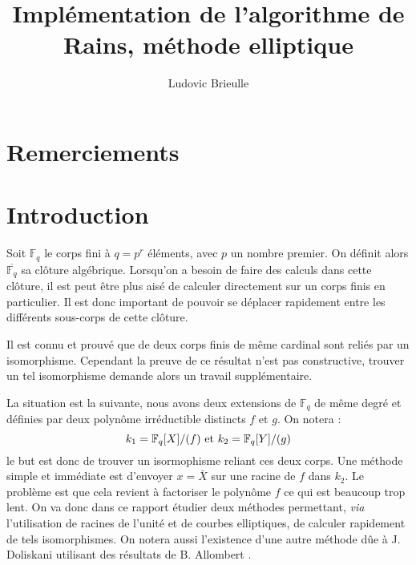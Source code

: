 \documentclass[a4paper]{article} %
\numberwithin{section}{part}
\numberwithin{equation}{section}
\newcommand\GF[1]{\mathbb{F}_{#1}}
\begin{document}
\title{Implémentation de l'algorithme de Rains, méthode elliptique}
\author{Ludovic Brieulle}
\newtheorem{thm}{Thèorème}[section]
\newtheorem{lem}[thm]{Lemme}
\newtheorem{cor}{Corollaire}[thm]
\newtheorem{prop}[thm]{Proposition}
\theoremstyle{definition}
\newtheorem{defn}[thm]{Définition}
\newtheorem*{ex}{Exemple}
\theoremstyle{remark}
\newtheorem{rem}{Remarque}[thm]

\maketitle
\part*{Remerciements}

\tableofcontents
\newpage

\part*{Introduction}
Soit $\GF{q}$ le corps fini à $q = p^r$ éléments, avec $p$ un nombre premier. On
définit alors $\overline{\GF{q}}$ sa clôture algébrique. Lorsqu'on a besoin de
faire des calculs dans cette clôture, il est peut être plus aisé de calculer
directement sur un corps finis en particulier. Il est donc important de pouvoir
se déplacer rapidement entre les différents sous-corps de cette clôture.\par
Il est connu et prouvé que de deux corps finis de même cardinal sont reliés par
un isomorphisme. Cependant la preuve de ce résultat n'est pas constructive,
trouver un tel isomorphisme demande alors un travail supplémentaire.\par
La situation est la suivante, nous avons deux extensions de $\GF{q}$ de même
degré et définies par deux polynôme irréductible distincts $f$ et $g$. On notera
:
\[k_1=\GF{q}[X]/(f)\textup{ et }k_2=\GF{q}[Y]/(g)\]
le but est donc de trouver un isormophisme reliant ces deux corps. Une méthode
simple et immédiate est d'envoyer $x = \bar{X}$ sur une racine de $f$ dans
$k_2$. Le problème est que cela revient à factoriser le polynôme $f$ ce qui est
beaucoup trop lent.
On va donc dans ce rapport étudier deux méthodes permettant, \textit{via}
l'utilisation de racines de l'unité et de courbes elliptiques, de calculer
rapidement de tels isomorphismes. On notera aussi l'existence d'une autre
méthode dûe à J. Doliskani \cite{Dol} utilisant des résultats de B. Allombert
\cite{All}.
\end{document}
